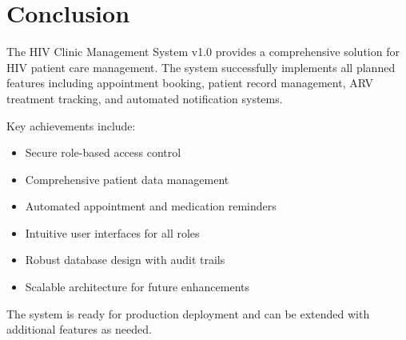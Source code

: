 \documentclass[12pt,a4paper]{article}
\begin{document}
\section{Conclusion}

The HIV Clinic Management System v1.0 provides a comprehensive solution for HIV patient care management. The system successfully implements all planned features including appointment booking, patient record management, ARV treatment tracking, and automated notification systems.

Key achievements include:
\begin{itemize}
    \item Secure role-based access control
    \item Comprehensive patient data management
    \item Automated appointment and medication reminders
    \item Intuitive user interfaces for all roles
    \item Robust database design with audit trails
    \item Scalable architecture for future enhancements
\end{itemize}

The system is ready for production deployment and can be extended with additional features as needed.
\end{document}
